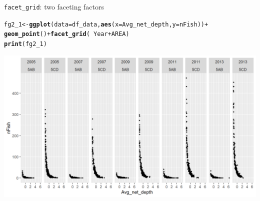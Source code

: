 \documentclass{beamer}\usepackage[]{graphicx}\usepackage[]{color}
\makeatletter
\newcommand{\hlopt}[1]{\textcolor[rgb]{0,0,0}{#1}}%
\newcommand{\hlstd}[1]{\textcolor[rgb]{0.345,0.345,0.345}{#1}}%
\newcommand{\hlkwb}[1]{\textcolor[rgb]{0.69,0.353,0.396}{#1}}%
\newcommand{\hlkwc}[1]{\textcolor[rgb]{0.333,0.667,0.333}{#1}}%
\newcommand{\hlkwd}[1]{\textcolor[rgb]{0.737,0.353,0.396}{\textbf{#1}}}%
\newenvironment{kframe}{%
 \def\at@end@of@kframe{}%
 \ifinner\ifhmode%
  \def\at@end@of@kframe{\end{minipage}}%
  \begin{minipage}{\columnwidth}%
 \fi\fi%
 \def\FrameCommand##1{\hskip\@totalleftmargin \hskip-\fboxsep
 \colorbox{shadecolor}{##1}\hskip-\fboxsep
     \hskip-\linewidth \hskip-\@totalleftmargin \hskip\columnwidth}%
 \MakeFramed {\advance\hsize-\width
   \@totalleftmargin\z@ \linewidth\hsize
   \@setminipage}}%
 {\par\unskip\endMakeFramed%
 \at@end@of@kframe}
\newenvironment{knitrout}{}{} %
\makeatother
\begin{document}
\begin{frame}[fragile]{\lstinline{facet_grid}: two faceting factors}
\begin{knitrout}\footnotesize
{}\color{fgcolor}\begin{kframe}
\begin{alltt}
\hlstd{fg2_1} \hlkwb{<-} \hlkwd{ggplot}\hlstd{(}\hlkwc{data}\hlstd{=df_data,} \hlkwd{aes}\hlstd{(}\hlkwc{x}\hlstd{=Avg_net_depth,} \hlkwc{y}\hlstd{=nFish))} \hlopt{+}
  \hlkwd{geom_point}\hlstd{()} \hlopt{+} \hlkwd{facet_grid}\hlstd{(}\hlopt{~} \hlstd{Year} \hlopt{+} \hlstd{AREA)}
\hlkwd{print}\hlstd{(fg2_1)}
\end{alltt}
\end{kframe}

{\centering \includegraphics[width=.9\linewidth]{figure/facet_grid_4-1} 

}



\end{knitrout}
\end{frame}
\end{document}
